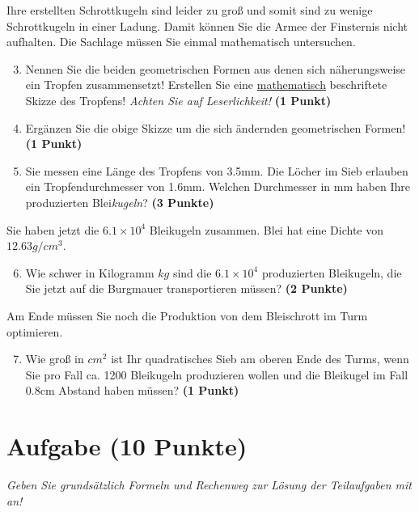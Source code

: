 \documentclass[a4paper, 9pt]{scrartcl}\usepackage[]{graphicx}\usepackage[]{xcolor}
\begin{document}
Ihre erstellten Schrottkugeln sind leider zu gro{\ss} und somit sind zu wenige Schrottkugeln in einer Ladung. Damit können Sie die Armee der Finsternis nicht aufhalten. Die Sachlage müssen Sie einmal mathematisch untersuchen.

\begin{enumerate}
  \setcounter{enumi}{2}
\item Nennen Sie die beiden geometrischen Formen aus denen sich näherungsweise ein Tropfen zusammensetzt! Erstellen Sie eine \uline{mathematisch} beschriftete Skizze des Tropfens! \textit{Achten Sie auf Leserlichkeit!} \textbf{(1 Punkt)}
\item Ergänzen Sie die obige Skizze um die sich ändernden geometrischen Formen! \textbf{(1 Punkt)}
\item Sie messen eine Länge des Tropfens von 3.5mm. Die Löcher im Sieb erlauben ein Tropfendurchmesser von 1.6mm. Welchen Durchmesser in mm haben Ihre produzierten Blei\textit{kugeln}?  \textbf{(3 Punkte)}
\end{enumerate}

Sie haben jetzt die \ensuremath{6.1\times 10^{4}} Bleikugeln zusammen. Blei hat eine Dichte
von $12.63g/cm^3$.

\begin{enumerate}
  \setcounter{enumi}{5}
\item Wie schwer in Kilogramm $kg$ sind die \ensuremath{6.1\times 10^{4}} produzierten
  Bleikugeln, die Sie jetzt auf die Burgmauer transportieren müssen?
  \textbf{(2 Punkte)}
\end{enumerate}

Am Ende müssen Sie noch die Produktion von dem Bleischrott im Turm optimieren.

\begin{enumerate}
  \setcounter{enumi}{6}
\item Wie gro{\ss} in $cm^2$ ist Ihr quadratisches Sieb am oberen Ende des Turms,
  wenn Sie pro Fall ca. 1200 Bleikugeln produzieren wollen und
  die Bleikugel im Fall 0.8cm Abstand haben müssen?  \textbf{(1
    Punkt)}
\end{enumerate}
 
\clearpage

\section{Aufgabe \hfill (10 Punkte)}

\textit{Geben Sie grundsätzlich Formeln und Rechenweg zur Lösung der Teilaufgaben mit an!} \\[1Ex]
 
\end{document}
